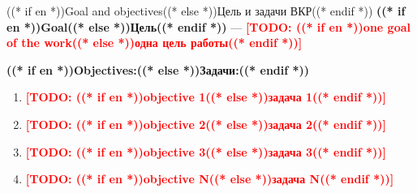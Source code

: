 \documentclass[aspectratio=169, 14pt]{beamer}
\newcommand{\todo}[1]{\textcolor{red}{\textbf{[TODO: #1]}}}
\begin{document}
\begin{frame}{((* if en *))Goal and objectives((* else *))Цель и задачи ВКР((* endif *))}
  \textcolor{hseblue}{\textbf{((* if en *))Goal((* else *))Цель((* endif *))}} — \todo{((* if en *))one goal of the work((* else *))одна цель работы((* endif *))}

  \vspace{0.5em}
  {\color{hseblue}\textbf{((* if en *))Objectives:((* else *))Задачи:((* endif *))}}
  \begin{enumerate}
    \item \todo{((* if en *))objective 1((* else *))задача 1((* endif *))}
    \item \todo{((* if en *))objective 2((* else *))задача 2((* endif *))}
    \item \todo{((* if en *))objective 3((* else *))задача 3((* endif *))}
    \item \todo{((* if en *))objective N((* else *))задача N((* endif *))}
  \end{enumerate}
\end{frame}
\end{document}
